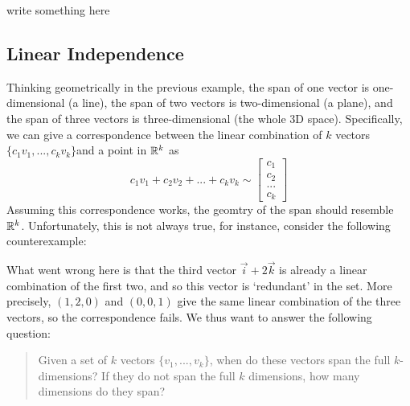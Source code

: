 \todo write something here\\
\subsection{Linear Independence}
Thinking geometrically in the previous example, the span of one vector is one-dimensional (a line), the span of two vectors is two-dimensional (a plane),
and the span of three vectors is three-dimensional (the whole 3D space). Specifically,
we can give a correspondence between the linear combination of $k$ vectors $\{c_1{v}_1,...,c_k{v}_k\}$and a point in $\mathbb{R}^k$ as \[
	c_1{v}_1+c_2{v}_2+...+c_k{v}_k \sim \begin{bmatrix}
		c_1 \\ c_2\\ ...\\ c_k
	\end{bmatrix}
\]
Assuming this correspondence works, the geomtry of the span should resemble $\mathbb{R}^k$.
Unfortunately, this is not always true, for instance, consider the following counterexample:
\todo

What went wrong here is that the third vector $\vec{i}+2\vec{k}$ is already a linear combination of the first two, and so this vector is `redundant' in the set.
More precisely, $(1,2,0)$ and $(0,0,1)$ give the same linear combination of the three vectors, so the correspondence fails. We thus want to answer the following question:
\begin{quotation}
	Given a set of $k$ vectors $\{{v}_1,...,{v}_k\}$, when do these vectors span the full $k$-dimensions?
	If they do not span the full $k$ dimensions, how many dimensions do they span?  
\end{quotation}

